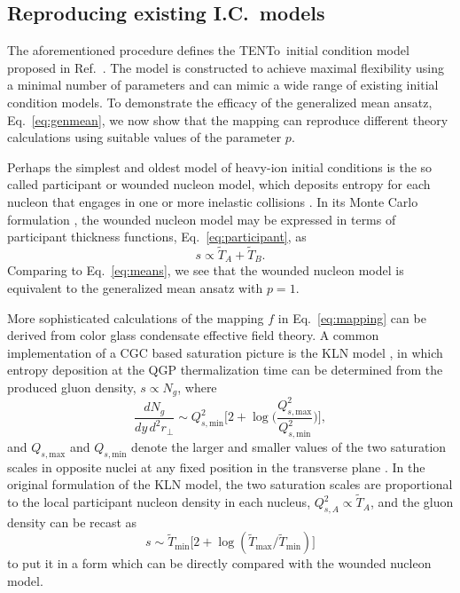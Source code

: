 \documentclass[aps,prc,reprint,amsmath,nofootinbib,noeprint]{revtex4-1}
\newcommand{\trento}{T\raisebox{-0.5ex}{R}ENTo}
\newcommand{\T}{\tilde{T}}
\newcommand{\Qs}[1]{Q_{s,\text{#1}}}
\begin{document}
\subsection{Reproducing existing I.C.\ models}


The aforementioned procedure defines the \trento\ initial condition model proposed in Ref.~\cite{Moreland:2014oya}.
The model is constructed to achieve maximal flexibility using a minimal number of parameters and can mimic a wide range of existing initial condition models.
To demonstrate the efficacy of the generalized mean ansatz, Eq.~\eqref{eq:genmean}, we now show that the mapping can reproduce different theory calculations using suitable values of the parameter $p$.

Perhaps the simplest and oldest model of heavy-ion initial conditions is the so called participant or wounded nucleon model, which deposits entropy for each nucleon that engages in one or more inelastic collisions \cite{Bialas:1976ed}.
In its Monte Carlo formulation \cite{Shor:1988vk, Wang:1991hta, Alver:2008aq, Broniowski:2007nz}, the wounded nucleon model may be expressed in terms of participant thickness functions, Eq.~\eqref{eq:participant}, as
\begin{equation}
  s \propto \T_A + \T_B.
  \label{eq:wn}
\end{equation}
Comparing to Eq.~\eqref{eq:means}, we see that the wounded nucleon model is equivalent to the generalized mean ansatz with $p=1$.

More sophisticated calculations of the mapping $f$ in Eq.~\eqref{eq:mapping} can be derived from color glass condensate effective field theory.
A common implementation of a CGC based saturation picture is the KLN model \cite{Kharzeev:2001yq, Kharzeev:2002ei, Kharzeev:2004if}, in which entropy deposition at the QGP thermalization time can be determined from the produced gluon density, $s \propto N_g$, where
\begin{equation}
  \frac{dN_g}{dy\,d^2r_\perp} \sim \Qs{min}^2 \biggl[
    2 + \log \biggl(\frac{\Qs{max}^2}{\Qs{min}^2} \biggr)
  \biggr],
  \label{eq:kln}
\end{equation}
and $\Qs{max}$ and $\Qs{min}$ denote the larger and smaller values of the two saturation scales in opposite nuclei at any fixed position in the transverse plane \cite{Drescher:2006ca}.
In the original formulation of the KLN model, the two saturation scales are proportional to the local participant nucleon density in each nucleus, $Q^2_{s,A} \propto \T_A$, and the gluon density can be recast as
\begin{equation}
  s \sim \T_\text{min} \bigl[ 2 + \log(\T_\text{max}/\T_\text{min}) \bigr]
\end{equation}
to put it in a form which can be directly compared with the wounded nucleon model.
\end{document}
